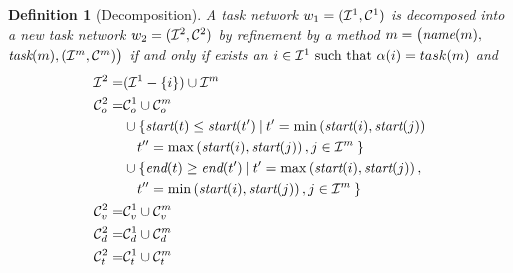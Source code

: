 \documentclass[letterpaper]{article} %
\newtheorem{definition}{Definition}
\newcommand{\name}{\text{\it name}}
\newcommand{\tstart}{\text{\it start}}
\newcommand{\tend}{\text{\it end}}
\newcommand{\task}{\text{\it task}}
\begin{document}
\begin{definition}[Decomposition]\label{def:decomp}
  A task network $w_1= ({\cal{I}}^1, {\cal{C}}^{1})$ is decomposed into a new task network
  $w_2= ({\cal{I}}^2, {\cal{C}}^{2})$ by refinement by a method $m = \bigl(\name(m),$ $\task(m), ({\cal{I}}^m, {\cal{C}}^{m})\bigr)$ 
  if and only if exists an $i \in {\cal{I}}^1 \text{ such that } \alpha(i) = task(m)$ and
\begin{equation*} \label{eq1}
\begin{aligned}
{\cal{I}}^2 = & ({\cal{I}}^1 - \{i\}) \cup {\cal{I}}^m\\
{\cal{C}}^{2}_{o} = & {\cal{C}}^{1}_{o} \cup {\cal{C}}^{m}_{o} \\
& \cup \{ \tstart(t) \leq \tstart(t') \: | \: t'= \min\left(\tstart(i),\tstart(j)\right)\\
&\quad t''= \max\left(\tstart(i),\tstart(j)\right), j \in {\cal{I}}^m \:  \}  \\
& \cup \{ \tend(t) \geq \tend(t') \: | \: t'= \max\left(\tstart(i),\tstart(j)\right),\\
& \quad t''= \min\left(\tstart(i),\tstart(j)\right), j \in {\cal{I}}^m \:  \}\\
{\cal{C}}^{2}_{v}  = & {\cal{C}}^{1}_{v} \cup {\cal{C}}^{m}_{v} \\
{\cal{C}}^{2}_{d}  = & {\cal{C}}^{1}_{d} \cup {\cal{C}}^{m}_{d} \\
{\cal{C}}^{2}_{t}  = & {\cal{C}}^{1}_{t} \cup {\cal{C}}^{m}_{t} \\
\end{aligned}
\end{equation*}
\end{definition}
\end{document}
